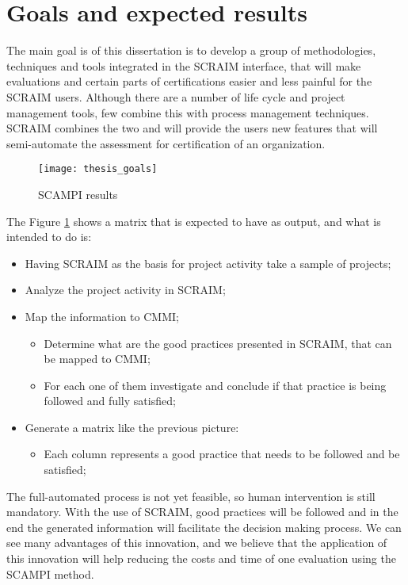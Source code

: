 \section{Goals and expected results} \label{sec:goals}

The main goal is of this dissertation is to develop a group of methodologies, techniques and tools integrated in the SCRAIM interface, that will make evaluations and certain parts of certifications easier and less painful for the SCRAIM users.
Although there are a number of life cycle and project management tools, few combine this with process management techniques. SCRAIM combines the two and will provide the users new features that will semi-automate the assessment for certification of an organization. 

\begin{figure}[h]
	\begin{center}
		\leavevmode
		\texttt{[image: thesis\_goals]}
		\caption{SCAMPI results}
		\label{fig:arch}
	\end{center}
\end{figure}

The Figure \ref{fig:arch} shows a matrix that is expected to have as output, and what is intended to do is:
\begin{itemize}
	\item Having SCRAIM as the basis for project activity take a sample of projects;
	\item Analyze the project activity in SCRAIM;
	\item Map the information to CMMI;
	\begin{itemize}
		\item Determine what are the good practices presented in SCRAIM, that can be mapped to CMMI;
		\item For each one of them investigate and conclude if that practice is being followed and fully satisfied;
	\end{itemize}
	\item Generate a matrix like the previous picture:
	\begin{itemize}
		\item Each column represents a good practice that needs to be followed and be satisfied;
	\end{itemize}
\end{itemize}	

The full-automated process is not yet feasible, so human intervention is still mandatory. With the use of SCRAIM, good practices will be followed and in the end the generated information will facilitate the decision making process. We can see many advantages of this innovation, and we believe that the application of this innovation will help reducing the costs and time of one evaluation using the SCAMPI method.

